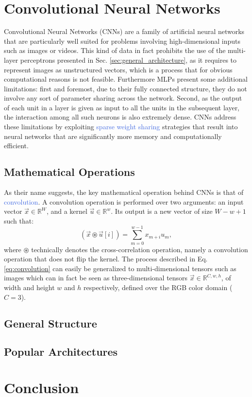 \section{Convolutional Neural Networks}
\label{sec:convolutional_networks}

Convolutional Neural Networks (CNNs) are a family of artificial neural networks that are particularly well suited for problems involving high-dimensional inputs such as images or videos. This kind of data in fact prohibits the use of the multi-layer perceptrons presented in Sec. \ref{sec:general_architecture}, as it requires to represent images as unstructured vectors, which is a process that for obvious computational reasons is not feasible. Furthermore MLPs present some additional limitations: first and foremost, due to their fully connected structure, they do not involve any sort of parameter sharing across the network. Second, as the output of each unit in a layer is given as input to all the units in the subsequent layer, the interaction among all such neurons is also extremely dense. CNNs address these limitations by exploiting \textcolor{RoyalBlue}{sparse weight sharing} strategies that result into neural networks that are significantly more memory and computationally efficient. 

\subsection{Mathematical Operations}
\label{sec:operations}

As their name suggests, the key mathematical operation behind CNNs is that of \textcolor{RoyalBlue}{convolution}. A convolution operation is performed over two arguments: an input vector $\vec{x}\in\mathds{R}^{W}$, and a kernel $\vec{u}\in\mathds{R}^{w}$. Its output is a new vector of size $W-w+1$ such that:
\begin{equation}
	(\vec{x}\circledast\vec{u}[i]) = \sum_{m=0}^{w-1}x_{m+i}u_m,
	\label{eq:convolution}
\end{equation}
where $\circledast$ technically denotes the cross-correlation operation, namely a convolution operation that does not flip the kernel. The process described in Eq. \ref{eq:convolution} can easily be generalized to multi-dimensional tensors such as images which can in fact be seen as three-dimensional tensors $\vec{x}\in\mathds{R}^{C,w,h}$, of width and height $w$ and $h$ respectively, defined over the RGB color domain ($C=3$). 





\subsection{General Structure}
\label{sec:general_structure}

\subsection{Popular Architectures}
\label{sec:architectures}


\section{Conclusion}
\label{sec:conclusion01}
